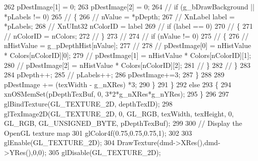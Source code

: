 \begin{DoxyCode}
{{262                                 pDestImage[1] = 0;
263                                 pDestImage[2] = 0;
264 \textcolor{comment}{//                                 if (g\_bDrawBackground || *pLabels != 0)}
265 \textcolor{comment}{//                                 \{}
266 \textcolor{comment}{//                                         nValue = *pDepth;}
267 \textcolor{comment}{//                                         XnLabel label = *pLabels;}
268 \textcolor{comment}{//                                         XnUInt32 nColorID = label %
269 \textcolor{comment}{//                                         if (label == 0)}
270 \textcolor{comment}{//                                         \{}
271 \textcolor{comment}{//                                                 nColorID = nColors;}
272 \textcolor{comment}{//                                         \}}
273 \textcolor{comment}{// }
274 \textcolor{comment}{//                                         if (nValue != 0)}
275 \textcolor{comment}{//                                         \{}
276 \textcolor{comment}{//                                                 nHistValue = g\_pDepthHist[nValue];}
277 \textcolor{comment}{// }
278 \textcolor{comment}{//                                                 pDestImage[0] = nHistValue * Colors[nColorID][0]; }
279 \textcolor{comment}{//                                                 pDestImage[1] = nHistValue * Colors[nColorID][1];}
280 \textcolor{comment}{//                                                 pDestImage[2] = nHistValue * Colors[nColorID][2];}
281 \textcolor{comment}{//                                         \}}
282 \textcolor{comment}{//                                 \}}
283 
284                                 pDepth++;
285 \textcolor{comment}{//                                 pLabels++;}
286                                 pDestImage+=3;
287                         \}
288 
289                         pDestImage += (texWidth - g\_nXRes) *3;
290                 \}
291         \}
292         \textcolor{keywordflow}{else}
293         \{
294                 xnOSMemSet(pDepthTexBuf, 0, 3*2*g\_nXRes*g\_nYRes);
295         \}
296 
297         glBindTexture(GL\_TEXTURE\_2D, depthTexID);
298         glTexImage2D(GL\_TEXTURE\_2D, 0, GL\_RGB, texWidth, texHeight, 0, GL\_RGB, GL\_UNSIGNED\_BYTE, 
      pDepthTexBuf);
299 
300         \textcolor{comment}{// Display the OpenGL texture map}
301         glColor4f(0.75,0.75,0.75,1);
302 
303         glEnable(GL\_TEXTURE\_2D);
304         DrawTexture(dmd->XRes(),dmd->YRes(),0,0); 
305         glDisable(GL\_TEXTURE\_2D);
}}}
\end{DoxyCode}

